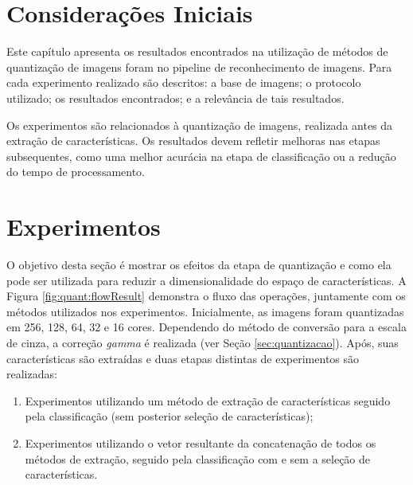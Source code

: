
\section{Considerações Iniciais}

Este capítulo apresenta os resultados encontrados na utilização de métodos de quantização de imagens foram no pipeline de reconhecimento de imagens. Para cada experimento realizado são descritos: a base de imagens; o protocolo utilizado; os resultados encontrados; e a relevância de tais resultados.

Os experimentos são relacionados à quantização de imagens, realizada antes da extração de características. Os resultados devem refletir melhoras nas etapas subsequentes, como uma melhor acurácia na etapa de classificação ou a redução do tempo de processamento.

\section{Experimentos}

O objetivo desta seção é mostrar os efeitos da etapa de quantização e como ela pode ser utilizada para reduzir a dimensionalidade do espaço de características. A Figura \ref{fig:quant:flowResult} demonstra o fluxo das operações, juntamente com os métodos utilizados nos experimentos. Inicialmente, as imagens foram quantizadas em 256, 128, 64, 32 e 16 cores. Dependendo do método de conversão para a escala de cinza, a correção \textit{gamma} é realizada (ver Seção \ref{sec:quantizacao}). Após, suas características são extraídas e duas etapas distintas de experimentos são realizadas:

\begin{enumerate}
  \item Experimentos utilizando um método de extração de características seguido pela classificação (sem posterior seleção de características);
  \item Experimentos utilizando o vetor resultante da concatenação de todos os métodos de extração, seguido pela classificação com e sem a seleção de características.
\end{enumerate}

